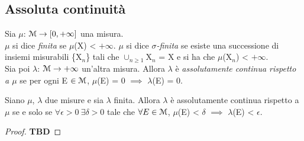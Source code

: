 \documentclass[Completo.tex]{subfiles}
\begin{document}
	\subsection{Assoluta continuità}
	\begin{Def}
		Sia $\mu$: $\eu[M] \ra [0, +\infty]$ una misura. \\
		$\mu$ si dice \textit{finita} se $\mu$(X) < $+\infty$. $\mu$ si dice \textit{$\sigma$-finita} se esiste una successione di insiemi misurabili \{X$_n$\} tali che $\cup_{n\geq1}$X$_n$ = X e si ha che $\mu$(X$_n$) < $+\infty$. \\
		Sia poi $\lambda$: $\eu[M] \ra +\infty$ un'altra misura. Allora $\lambda$ è \textit{assolutamente continua rispetto a $\mu$} se per ogni E $\in \eu[M]$, $\mu$(E) = 0 $\implies$ $\lambda$(E) = 0.
	\end{Def}
	\begin{Th}
		Siano $\mu$, $\lambda$ due misure e sia $\lambda$ finita. Allora $\lambda$ è assolutamente continua rispetto a $\mu$ se e solo se $\forall \epsilon > 0 \ \exists \delta > 0$ tale che $\forall E \in \eu[M]$, $\mu$(E) < $\delta$ $\implies$ $\lambda$(E) < $\epsilon$.
	\end{Th}
	\begin{proof}
		\textbf{TBD}
	\end{proof}
\end{document}
